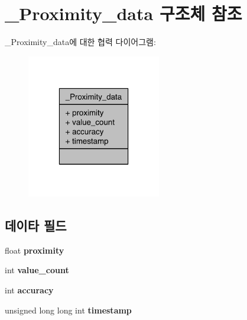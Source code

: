 \hypertarget{struct___proximity__data}{\section{\-\_\-\-Proximity\-\_\-data 구조체 참조}
\label{struct___proximity__data}
}


\-\_\-\-Proximity\-\_\-data에 대한 협력 다이어그램\-:\nopagebreak
\begin{figure}[H]
\begin{center}
\leavevmode
\includegraphics[width=166pt]{dd/d1d/struct___proximity__data__coll__graph}
\end{center}
\end{figure}
\subsection*{데이타 필드}
\begin{DoxyCompactItemize}
\item 
\hypertarget{struct___proximity__data_a5767a762273412ecff24202966e9d67b}{float {\bfseries proximity}}\label{struct___proximity__data_a5767a762273412ecff24202966e9d67b}

\item 
\hypertarget{struct___proximity__data_a40a079bfc72408819dc78da308203a74}{int {\bfseries value\-\_\-count}}\label{struct___proximity__data_a40a079bfc72408819dc78da308203a74}

\item 
\hypertarget{struct___proximity__data_a5565cf9073275f9713f9016e7c10d25f}{int {\bfseries accuracy}}\label{struct___proximity__data_a5565cf9073275f9713f9016e7c10d25f}

\item 
\hypertarget{struct___proximity__data_a8de02c4128636a7bf630ff5428f60c8d}{unsigned long long int {\bfseries timestamp}}\label{struct___proximity__data_a8de02c4128636a7bf630ff5428f60c8d}

\end{DoxyCompactItemize}


